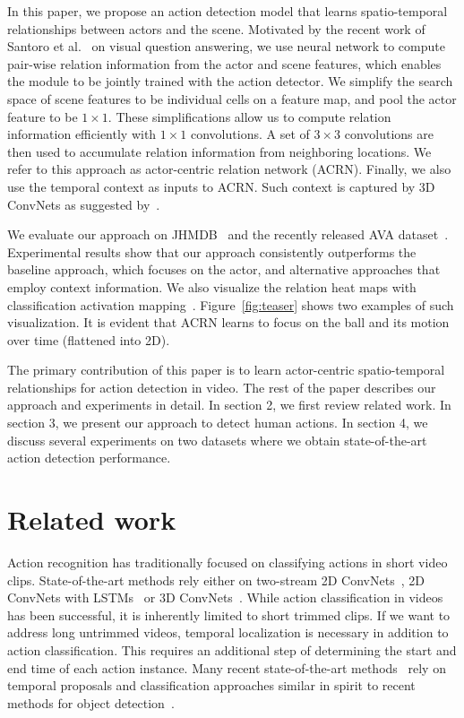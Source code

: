 \documentclass[runningheads]{llncs}
\begin{document}
In this paper, we propose an action detection model that learns spatio-temporal relationships between actors and the scene. Motivated by the recent work of Santoro et al.~\cite{RN_deepmind17} on visual question answering, we use neural network to compute pair-wise relation information from the actor and scene features, which enables the module to be jointly trained with the action detector. We simplify the search space of scene features to be individual cells on a feature map, and pool the actor feature to be $1\times 1$. These simplifications allow us to compute relation information efficiently with $1\times 1$ convolutions. A set of $3\times 3$ convolutions are then used to accumulate relation information from neighboring locations. We refer to this approach as actor-centric relation network (ACRN). Finally, we also use the temporal context as inputs to ACRN. Such context is captured by 3D ConvNets as suggested by~\cite{ava_cvpr18}.

We evaluate our approach on JHMDB~\cite{jhmdb} and the recently released AVA dataset~\cite{ava_cvpr18}. Experimental results show that our approach consistently outperforms the baseline approach, which focuses on the actor, and alternative approaches that employ context information. We also visualize the relation heat maps with classification activation mapping~\cite{zhou2016cvpr_cam}. Figure~\ref{fig:teaser} shows two examples of such visualization. It is evident that ACRN learns to focus on the ball and its motion over time (flattened into 2D).

The primary contribution of this paper is to learn actor-centric spatio-temporal relationships for action detection in video. The rest of the paper describes our approach and experiments in detail. In section 2, we first review related work. In section 3, we present our approach to detect human actions. In section 4, we discuss several experiments on two datasets where we obtain state-of-the-art action detection performance.
 
\section{Related work}


 Action recognition has traditionally focused on classifying actions in short video clips.  State-of-the-art methods rely either on two-stream 2D ConvNets~\cite{Karpathy2014,simonyan2014}, 2D ConvNets with LSTMs~\cite{lrcn2015,ng_cvpr2015} or 3D ConvNets~\cite{i3d_cvpr17,tran2015}.
While action classification in videos has been successful, it is inherently limited to short trimmed clips. If we want to address long untrimmed videos, temporal
localization is necessary in addition to action classification. This requires an additional step of determining the start and end time of each action instance. Many recent state-of-the-art methods~\cite{buch_cvpr17,dai_iccv17,xu_iccv17} rely on  temporal proposals and classification approaches similar in spirit to recent methods for object detection~\cite{ren2015faster}.
\end{document}
